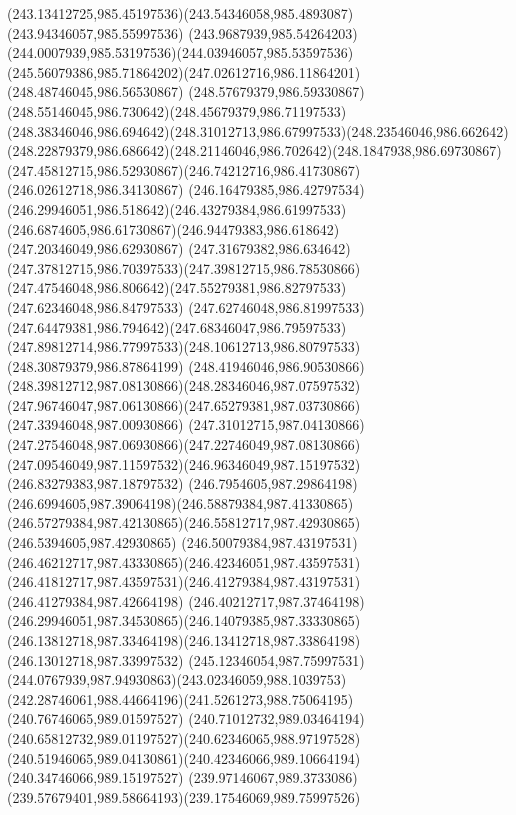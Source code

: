 {    \curveto(243.13412725,985.45197536)(243.54346058,985.4893087)(243.94346057,985.55997536)
    \curveto(243.9687939,985.54264203)(244.0007939,985.53197536)(244.03946057,985.53597536)
    \curveto(245.56079386,985.71864202)(247.02612716,986.11864201)(248.48746045,986.56530867)
    \curveto(248.57679379,986.59330867)(248.55146045,986.730642)(248.45679379,986.71197533)
    \curveto(248.38346046,986.694642)(248.31012713,986.67997533)(248.23546046,986.662642)
    \curveto(248.22879379,986.686642)(248.21146046,986.702642)(248.1847938,986.69730867)
    \curveto(247.45812715,986.52930867)(246.74212716,986.41730867)(246.02612718,986.34130867)
    \curveto(246.16479385,986.42797534)(246.29946051,986.518642)(246.43279384,986.61997533)
    \curveto(246.6874605,986.61730867)(246.94479383,986.618642)(247.20346049,986.62930867)
    \curveto(247.31679382,986.634642)(247.37812715,986.70397533)(247.39812715,986.78530866)
    \curveto(247.47546048,986.806642)(247.55279381,986.82797533)(247.62346048,986.84797533)
    \curveto(247.62746048,986.81997533)(247.64479381,986.794642)(247.68346047,986.79597533)
    \curveto(247.89812714,986.77997533)(248.10612713,986.80797533)(248.30879379,986.87864199)
    \curveto(248.41946046,986.90530866)(248.39812712,987.08130866)(248.28346046,987.07597532)
    \curveto(247.96746047,987.06130866)(247.65279381,987.03730866)(247.33946048,987.00930866)
    \curveto(247.31012715,987.04130866)(247.27546048,987.06930866)(247.22746049,987.08130866)
    \curveto(247.09546049,987.11597532)(246.96346049,987.15197532)(246.83279383,987.18797532)
    \curveto(246.7954605,987.29864198)(246.6994605,987.39064198)(246.58879384,987.41330865)
    \curveto(246.57279384,987.42130865)(246.55812717,987.42930865)(246.5394605,987.42930865)
    \curveto(246.50079384,987.43197531)(246.46212717,987.43330865)(246.42346051,987.43597531)
    \curveto(246.41812717,987.43597531)(246.41279384,987.43197531)(246.41279384,987.42664198)
    \curveto(246.40212717,987.37464198)(246.29946051,987.34530865)(246.14079385,987.33330865)
    \curveto(246.13812718,987.33464198)(246.13412718,987.33864198)(246.13012718,987.33997532)
    \curveto(245.12346054,987.75997531)(244.0767939,987.94930863)(243.02346059,988.1039753)
    \curveto(242.28746061,988.44664196)(241.5261273,988.75064195)(240.76746065,989.01597527)
    \curveto(240.71012732,989.03464194)(240.65812732,989.01197527)(240.62346065,988.97197528)
    \curveto(240.51946065,989.04130861)(240.42346066,989.10664194)(240.34746066,989.15197527)
    \curveto(239.97146067,989.3733086)(239.57679401,989.58664193)(239.17546069,989.75997526)
}

